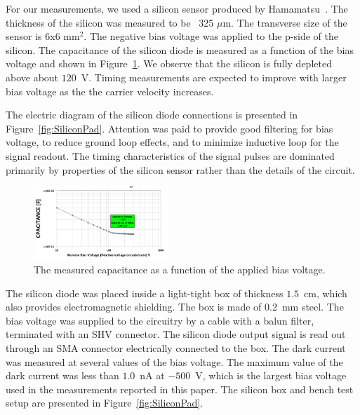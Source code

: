 \documentclass[12pt]{article}
\begin{document}
{For our measurements, we used a silicon sensor produced by
Hamamatsu~\cite{hamamatsu}. The thickness of the silicon was measured to be ~325
$\mu$m. The transverse size of the sensor is 6x6 mm$^2$. The negative bias
voltage was applied to the p-side of the silicon. The capacitance
of the silicon diode is measured as a function of the bias voltage
and shown in Figure~\ref{fig:SiliconDiode}. We observe that the silicon
is fully depleted above about $120$~V. Timing measurements are expected
to improve with larger bias voltage as the the carrier velocity increases.

The electric diagram of the silicon
diode connections is presented in Figure~\ref{fig:SiliconPad}. Attention was
paid to provide good filtering for bias voltage, to reduce ground loop effects, and
to minimize inductive loop for the signal readout. The timing characteristics
of the signal pulses are dominated primarily by properties of the
silicon sensor rather than the details of the circuit.

\begin{figure}[htbp] 
\centering
\includegraphics[width=0.45\textwidth]{plots/SiliconDiodeCV.png} 
\caption{The measured capacitance as a function of the applied bias voltage.} 
\label{fig:SiliconDiode} 
\end{figure} 

The silicon diode was placed inside a light-tight box of thickness $1.5$~cm,
which also provides electromagnetic shielding. The box is made of 0.2~mm steel.
The bias voltage was supplied to the circuitry by a cable with a balun filter,
terminated with an SHV connector. The silicon diode output signal is read out
through an SMA connector electrically connected to the box. The dark current was
measured at several values of the bias voltage. The maximum value of the dark
current was less than $1.0$~nA at $-500$~V, which is the largest bias voltage
used in the measurements reported in this paper. The silicon box and bench test
setup are presented in Figure~\ref{fig:SiliconPad}. 

}
\end{document}

